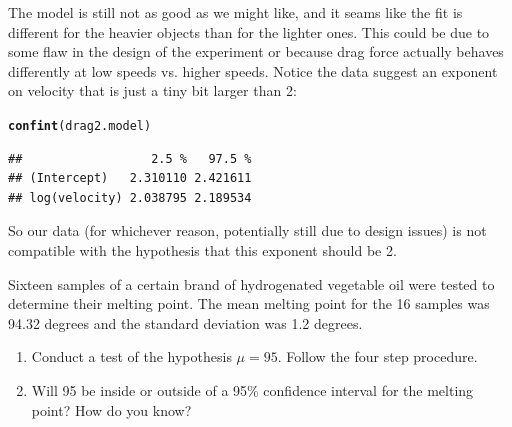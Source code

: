\documentclass[twoside]{book}\usepackage[]{graphicx}\usepackage[]{xcolor}
\makeatletter
\newcommand{\hlstd}[1]{\textcolor[rgb]{0.345,0.345,0.345}{#1}}%
\newcommand{\hlkwd}[1]{\textcolor[rgb]{0.737,0.353,0.396}{\textbf{#1}}}%
\newenvironment{kframe}{%
 \def\at@end@of@kframe{}%
 \ifinner\ifhmode%
  \def\at@end@of@kframe{\end{minipage}}%
  \begin{minipage}{\columnwidth}%
 \fi\fi%
 \def\FrameCommand##1{\hskip\@totalleftmargin \hskip-\fboxsep
 \colorbox{shadecolor}{##1}\hskip-\fboxsep
     \hskip-\linewidth \hskip-\@totalleftmargin \hskip\columnwidth}%
 \MakeFramed {\advance\hsize-\width
   \@totalleftmargin\z@ \linewidth\hsize
   \@setminipage}}%
 {\par\unskip\endMakeFramed%
 \at@end@of@kframe}
\newenvironment{knitrout}{}{} %
\makeatother
\begin{document}
\begin{solution}
\begin{knitrout}
\end{knitrout}
The model is still not as good as we might like, and it seams like the fit is different for the 
heavier objects than for the lighter ones.  This could be due to some flaw in the design of the 
experiment or because drag force actually behaves differently at low speeds vs. higher speeds.
Notice the data suggest an exponent on velocity that is just a tiny bit larger than 2:
\begin{knitrout}
\color{fgcolor}\begin{kframe}
\begin{alltt}
\hlkwd{confint}\hlstd{(drag2.model)}
\end{alltt}
\begin{verbatim}
##                  2.5 %   97.5 %
## (Intercept)   2.310110 2.421611
## log(velocity) 2.038795 2.189534
\end{verbatim}
\end{kframe}
\end{knitrout}
So our data (for whichever reason, potentially still due to design issues) is not compatible 
with the hypothesis that this exponent should be 2.
\end{solution}

\begin{problem}
	Sixteen samples of a certain brand of hydrogenated vegetable oil were tested to determine 
	their melting point.  The mean melting point for the 16 samples was 94.32 degrees 
	and the standard deviation was 1.2 degrees.

	\begin{enumerate}
		\item
    Conduct a test of the hypothesis $\mu = 95$.  Follow the four step procedure.
\item
	Will 95 be inside or outside of a 95\% confidence interval for the melting point?
	How do you know?
	\end{enumerate}
\end{problem}
\end{document}
